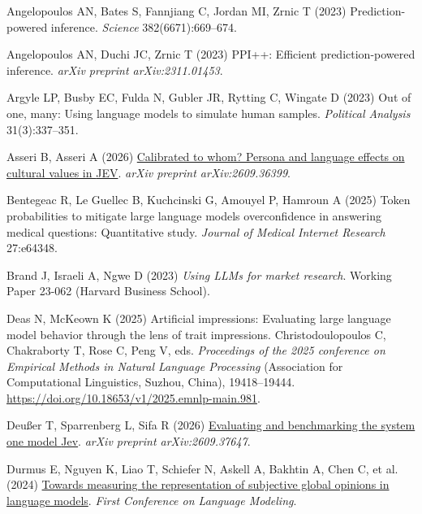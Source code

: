 \documentclass[
  letterpaper,
  DIV=11,
  numbers=noendperiod]{scrartcl}
\newlength{\cslhangindent}
\newenvironment{CSLReferences}[2] %
 {\begin{list}{}{%
  \setlength{\itemindent}{0pt}
  \setlength{\leftmargin}{0pt}
  \setlength{\parsep}{0pt}
  \ifodd #1
   \setlength{\leftmargin}{\cslhangindent}
   \setlength{\itemindent}{-1\cslhangindent}
  \fi
  \setlength{\itemsep}{#2\baselineskip}}}
 {\end{list}}
\begin{document}
\protect{}\label{refs}
\begin{CSLReferences}{1}{0}
Angelopoulos AN, Bates S, Fannjiang C, Jordan MI, Zrnic T (2023)
Prediction-powered inference. \emph{Science} 382(6671):669--674.

Angelopoulos AN, Duchi JC, Zrnic T (2023) {PPI++}: Efficient
prediction-powered inference. \emph{arXiv preprint arXiv:2311.01453}.

Argyle LP, Busby EC, Fulda N, Gubler JR, Rytting C, Wingate D (2023) Out
of one, many: Using language models to simulate human samples.
\emph{Political Analysis} 31(3):337--351.

Asseri B, Asseri A (2026)
\href{https://arxiv.org/abs/2609.36399}{Calibrated to whom? Persona and
language effects on cultural values in {JEV}}. \emph{arXiv preprint
arXiv:2609.36399}.

Bentegeac R, Le Guellec B, Kuchcinski G, Amouyel P, Hamroun A (2025)
Token probabilities to mitigate large language models overconfidence in
answering medical questions: Quantitative study. \emph{Journal of
Medical Internet Research} 27:e64348.

Brand J, Israeli A, Ngwe D (2023) \emph{Using {LLMs} for market
research}. Working Paper 23-062 (Harvard Business School).

Deas N, McKeown K (2025) Artificial impressions: Evaluating large
language model behavior through the lens of trait impressions.
Christodoulopoulos C, Chakraborty T, Rose C, Peng V, eds.
\emph{Proceedings of the 2025 conference on {Empirical Methods in
Natural Language Processing}} (Association for Computational
Linguistics, Suzhou, China), 19418--19444.
\url{https://doi.org/10.18653/v1/2025.emnlp-main.981}.

Deußer T, Sparrenberg L, Sifa R (2026)
\href{https://arxiv.org/abs/2609.37647}{Evaluating and benchmarking the
system one model {Jev}}. \emph{arXiv preprint arXiv:2609.37647}.

Durmus E, Nguyen K, Liao T, Schiefer N, Askell A, Bakhtin A, Chen C, et
al. (2024) \href{https://openreview.net/forum?id=zl16jLb91v}{Towards
measuring the representation of subjective global opinions in language
models}. \emph{First {Conference on Language Modeling}}.


\end{CSLReferences}
\end{document}
